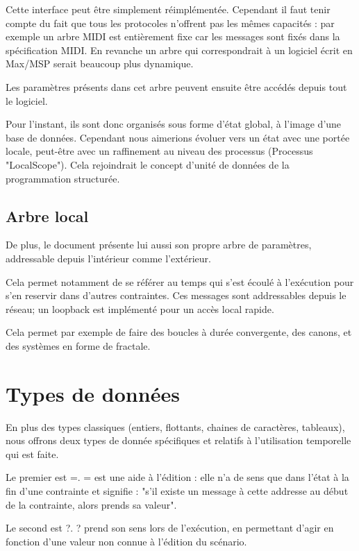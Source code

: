 \documentclass{sigchi}
\begin{document}

Cette interface peut être simplement réimplémentée. Cependant il faut tenir compte du fait que tous les protocoles n'offrent pas les mêmes capacités : par exemple un arbre MIDI est entièrement fixe car les messages sont fixés dans la spécification MIDI. En revanche un arbre qui correspondrait à un logiciel écrit en Max/MSP serait beaucoup plus dynamique.

Les paramètres présents dans cet arbre peuvent ensuite être accédés depuis tout le logiciel.

Pour l'instant, ils sont donc organisés sous forme d'état global, à l'image d'une base de données. Cependant nous aimerions évoluer vers un état avec une portée locale, peut-être avec un raffinement au niveau des processus (Processus "LocalScope"). Cela rejoindrait le concept d'unité de données de la programmation structurée.

\subsection{Arbre local}
De plus, le document présente lui aussi son propre arbre de paramètres, addressable depuis l'intérieur comme l'extérieur.

Cela permet notamment de se référer au temps qui s'est écoulé à l'exécution pour s'en reservir dans d'autres contraintes. Ces messages sont addressables depuis le réseau; un loopback est implémenté pour un accès local rapide.

Cela permet par exemple de faire des boucles à durée convergente, des canons, et des systèmes en forme de fractale. %

\section{Types de données}
En plus des types classiques (entiers, flottants, chaines de caractères, tableaux),  nous offrons deux types de donnée spécifiques et relatifs à l'utilisation temporelle qui est faite.

Le premier est =. = est une aide à l'édition : elle n'a de sens que dans l'état à la fin d'une contrainte et signifie : "s'il existe un message à cette addresse au début de la contrainte, alors prends sa valeur".

Le second est ?. ? prend son sens lors de l'exécution, en permettant d'agir en fonction d'une valeur non connue à l'édition du scénario.
\end{document}
